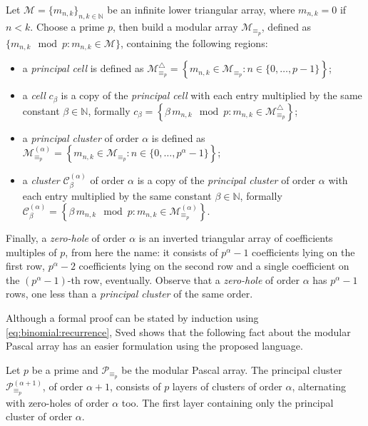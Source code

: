 Let $\mathcal{M}=\lbrace m_{n,k}\rbrace_{n,k\in\mathbb{N}}$ 
be an infinite lower triangular array, where $m_{n,k}=0$ if 
$n<k$. Choose a prime $p$, then build a modular array
$\mathcal{M}_{\equiv_{p}}$, defined as 
$\lbrace m_{n,k}\mod p : m_{n,k} \in \mathcal{M}\rbrace$, containing
the following regions:
\begin{itemize}

\item a \emph{principal cell} is %
    defined as
    $\mathcal{M}_{\equiv_{p}}^{\bigtriangleup} = 
        \left\lbrace m_{n,k}\in \mathcal{M}_{\equiv_{p}}: n\in\lbrace 0,\ldots,p-1\rbrace\right\rbrace$;

\item a \emph{cell} $c_{\beta}$ is a copy of the \emph{principal cell} with each entry multiplied 
by the same constant $\beta\in\mathbb{N}$, formally
    $c_{\beta}=\left\lbrace \beta\,m_{n,k}\mod p:m_{n,k}\in \mathcal{M}_{\equiv_{p}}^{\bigtriangleup}\right\rbrace$;

\item a \emph{principal cluster} of order $\alpha$ is %
    defined as
    $\mathcal{M}_{\equiv_{p}}^{(\alpha)} = 
        \left\lbrace m_{n,k}\in \mathcal{M}_{\equiv_{p}}: n\in\lbrace 0,\ldots,p^{\alpha}-1\rbrace\right\rbrace$;

\item a \emph{cluster} $\mathcal{C}_{\beta}^{(\alpha)}$ of order $\alpha$ is a copy of the \emph{principal cluster}
of order $\alpha$ with each entry multiplied 
by the same constant $\beta\in\mathbb{N}$, formally 
    $\mathcal{C}_{\beta}^{(\alpha)}=\left\lbrace \beta\,m_{n,k}\mod p:m_{n,k}\in \mathcal{M}_{\equiv_{p}}^{(\alpha)}\right\rbrace$.

\end{itemize}

Finally, a \emph{zero-hole} of order $\alpha$ is an inverted triangular array of
coefficients multiples of $p$, from here the name: it consists of $p^{\alpha}-1$
coefficients lying on the first row, $p^{\alpha}-2$ coefficients lying on the second row
and a single coefficient on the $(p^{\alpha}-1)$-th row, eventually. 
Observe that a \emph{zero-hole} of order $\alpha$ has $p^{\alpha}-1$ rows, one less
than a \emph{principal cluster} of the same order.

Although a formal proof can be stated by induction using
\autoref{eq:binomial:recurrence}, Sved shows that the following fact 
about the modular Pascal array has an easier formulation using the proposed language.

\begin{theorem}
    Let $p$ be a prime and $\mathcal{P}_{\equiv_{p}}$ be the 
    modular Pascal array. The principal cluster $\mathcal{P}_{\equiv_{p}}^{(\alpha+1)}$,
    of order $\alpha + 1$, consists of $p$ layers of clusters of order $\alpha$, alternating
    with zero-holes of order $\alpha$ too. The first layer containing only the principal
    cluster of order $\alpha$.
\end{theorem}
